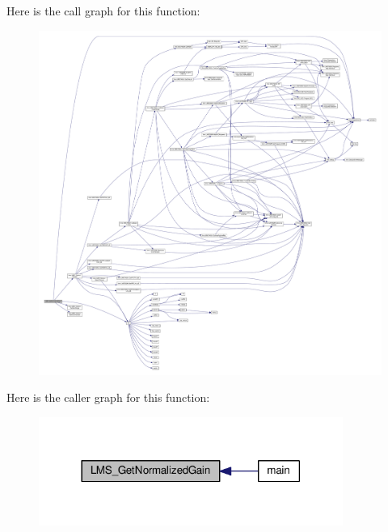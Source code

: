 Here is the call graph for this function\+:
\nopagebreak
\begin{figure}[H]
\begin{center}
\leavevmode
\includegraphics[width=350pt]{df/de1/lms7__api_8cpp_a8f560ebdc5a13f2337926acbe13a4120_cgraph}
\end{center}
\end{figure}




Here is the caller graph for this function\+:
\nopagebreak
\begin{figure}[H]
\begin{center}
\leavevmode
\includegraphics[width=282pt]{df/de1/lms7__api_8cpp_a8f560ebdc5a13f2337926acbe13a4120_icgraph}
\end{center}
\end{figure}


